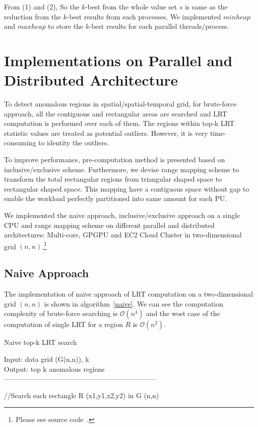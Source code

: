 \documentclass[AMA,LATO1COL]{WileyNJD-v2}
\newcommand\bigo{\mathcal O}
\begin{document}
From (1) and (2), So the $k$-best from the whole value set $s$ is same as the reduction from the $k$-best results from each processes. We implemented $minheap$ and $maxheap$ to store the $k$-best results for each parallel threads/process.

\section {Implementations on Parallel and Distributed Architecture }\label{IMPDA}
To detect anomalous regions in spatial/spatial-temporal grid, for brute-force approach, all the contiguous and rectangular areas are searched and LRT computation is performed over each of them. The regions within top-k LRT statistic values are treated as potential outliers. However, it is very time-consuming to identity the outliers.

To improve performance, pre-computation method is presented based on inclusive/exclusive scheme. Furthermore, we devise range mapping scheme to transform the total rectangular regions from triangular shaped space to rectangular shaped space. This mapping have a contiguous space without gap to enable the workload perfectly partitioned into same amount for each PU.

We implemented the naive approach, inclusive/exclusive approach on a single CPU and range mapping scheme on different parallel and distributed architectures: Multi-core, GPGPU and EC2 Cloud Cluster in two-dimensional grid $(n,n)$.\footnote{Please see source code~\cite{lrtsrc}.}

\subsection{Naive Approach}
The implementation of naive approach of LRT computation on a two-dimensional grid $(n,n)$ is shown in algorithm~\ref{naive}. We can see the computation complexity of brute-force searching is $\bigo(n^4)$ and the wost case of the computation of single LRT for a region $R$ is $\bigo(n^2)$.

\begin{algorithm}[t!]
\label{algobr1}
\caption{Naive top-k LRT search}\label{naive}
Input: data grid (G(n,n)), k\\
Output: top k anomalous regions\\
------------------------------------------------------------------ \\
\begin{algorithmic}[1]
\State //Search each rectangle R (x1,y1,x2,y2) in G (n,n)
\EndFor
\EndFor
\EndFor
\EndFor
{}
\end{algorithmic}
\end{algorithm}
\end{document}
